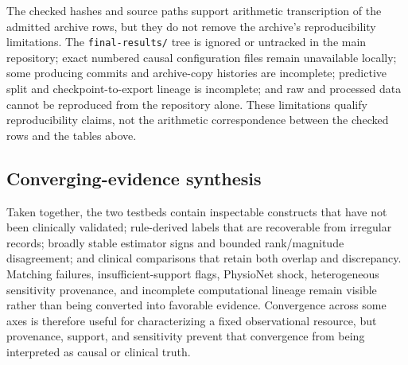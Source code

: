 The checked hashes and source paths support arithmetic transcription of the admitted archive rows, but they do not remove the archive's reproducibility limitations.  The \texttt{final-results/} tree is ignored or untracked in the main repository; exact numbered causal configuration files remain unavailable locally; some producing commits and archive-copy histories are incomplete; predictive split and checkpoint-to-export lineage is incomplete; and raw and processed data cannot be reproduced from the repository alone.  These limitations qualify reproducibility claims, not the arithmetic correspondence between the checked rows and the tables above.

\subsection{Converging-evidence synthesis}
\label{subsec:results:converging-evidence-synthesis}

Taken together, the two testbeds contain inspectable constructs that have not been clinically validated; rule-derived labels that are recoverable from irregular records; broadly stable estimator signs and bounded rank/magnitude disagreement; and clinical comparisons that retain both overlap and discrepancy.  Matching failures, insufficient-support flags, PhysioNet shock, heterogeneous sensitivity provenance, and incomplete computational lineage remain visible rather than being converted into favorable evidence.  Convergence across some axes is therefore useful for characterizing a fixed observational resource, but provenance, support, and sensitivity prevent that convergence from being interpreted as causal or clinical truth.
